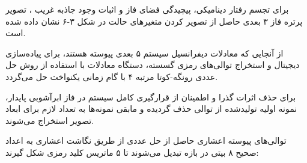 

برای تجسم رفتار دینامیکی، پیچیدگی فضای فاز و اثبات وجود جاذبه غریب ، تصوير پرتره فاز ۳ بعدی حاصل از تصویر کردن متغیرهای حالت  در شکل ۳{-}۶ نشان داده شده است.\par







از آنجایی که معادلات دیفرانسیل سیستم ۵ بعدی پیوسته هستند، برای پیاده‌سازی دیجیتال و استخراج توالی‌های رمزی گسسته، دستگاه معادلات با استفاده از روش حل عددی رونگه{-}کوتا مرتبه ۴  با گام زمانی یکنواخت  حل می‌گردد.\par



برای حذف اثرات گذرا  و اطمینان از قرارگیری کامل سیستم در فاز ابرآشوبی پایدار،  نمونه اولیه تولیدشده از توالی حذف گردیده و مابقی نمونه‌ها به تعداد لازم برای ابعاد تصویر  استخراج می‌شوند.\par




توالی‌های پیوسته اعشاری حاصل از حل عددی  از طریق نگاشت اعشاری به اعداد صحیح ۸ بیتی در بازه \lr{[0, 255]} تبدیل می‌شوند تا ۵ ماتریس کلید رمزی  شکل گیرند:\par

